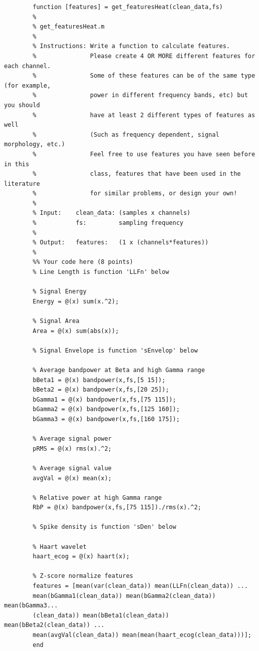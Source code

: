 \documentclass{article}
\begin{document}
	\begin{lstlisting}
		function [features] = get_featuresHeat(clean_data,fs)
		%
		% get_featuresHeat.m
		%
		% Instructions: Write a function to calculate features.
		%               Please create 4 OR MORE different features for each channel.
		%               Some of these features can be of the same type (for example, 
		%               power in different frequency bands, etc) but you should
		%               have at least 2 different types of features as well
		%               (Such as frequency dependent, signal morphology, etc.)
		%               Feel free to use features you have seen before in this
		%               class, features that have been used in the literature
		%               for similar problems, or design your own!
		%
		% Input:    clean_data: (samples x channels)
		%           fs:         sampling frequency
		%           
		% Output:   features:   (1 x (channels*features))
		% 
		%% Your code here (8 points)
		% Line Length is function 'LLFn' below

		% Signal Energy
		Energy = @(x) sum(x.^2);

		% Signal Area
		Area = @(x) sum(abs(x));

		% Signal Envelope is function 'sEnvelop' below

		% Average bandpower at Beta and high Gamma range
		bBeta1 = @(x) bandpower(x,fs,[5 15]);
		bBeta2 = @(x) bandpower(x,fs,[20 25]);
		bGamma1 = @(x) bandpower(x,fs,[75 115]);
		bGamma2 = @(x) bandpower(x,fs,[125 160]);
		bGamma3 = @(x) bandpower(x,fs,[160 175]);

		% Average signal power
		pRMS = @(x) rms(x).^2;

		% Average signal value
		avgVal = @(x) mean(x);

		% Relative power at high Gamma range
		RbP = @(x) bandpower(x,fs,[75 115])./rms(x).^2;

		% Spike density is function 'sDen' below

		% Haart wavelet
		haart_ecog = @(x) haart(x);

		% Z-score normalize features
		features = [mean(var(clean_data)) mean(LLFn(clean_data)) ...
		mean(bGamma1(clean_data)) mean(bGamma2(clean_data)) mean(bGamma3...
		(clean_data)) mean(bBeta1(clean_data)) mean(bBeta2(clean_data)) ...
		mean(avgVal(clean_data)) mean(mean(haart_ecog(clean_data)))];
		end
	\end{lstlisting}
\end{document}
